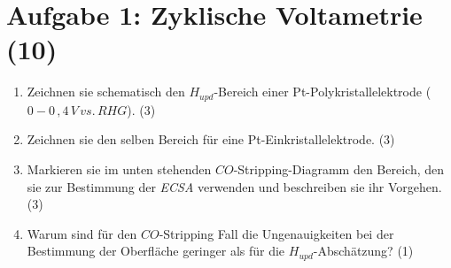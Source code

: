 \section*{Aufgabe 1: Zyklische Voltametrie (10)}
\begin{enumerate}
\item Zeichnen sie schematisch den \(H_{upd}\)-Bereich einer Pt-Polykristallelektrode
(\(0-0\, , 4\, V\,vs.\, RHG\)). (3)
\item Zeichnen sie den selben Bereich für eine Pt-Einkristallelektrode. (3)
\item Markieren sie im unten stehenden \(CO\)-Stripping-Diagramm den Bereich, den
sie zur Bestimmung der \textit{ECSA} verwenden und beschreiben sie ihr Vorgehen. (3)

\begin{center}
\begin{minipage}{\linewidth}
\centering
{}
\end{minipage}
\end{center}

\item Warum sind für den \(CO\)-Stripping Fall die Ungenauigkeiten bei der Bestimmung
der Oberfläche geringer als für die \(H_{upd}\)-Abschätzung? (1)

\end{enumerate}